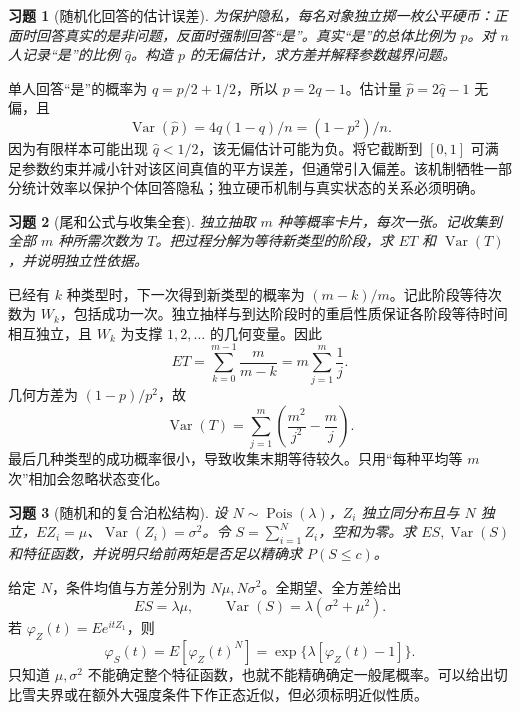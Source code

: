 \documentclass[12pt,fontset=fandol]{ctexart}
\newtheorem{exercise}{习题}[section]
\begin{document}
\begin{exercise}[随机化回答的估计误差]\label{q:B17.3}
为保护隐私，每名对象独立掷一枚公平硬币：正面时回答真实的是非问题，反面时强制回答“是”。真实“是”的总体比例为 $p$。对 $n$ 人记录“是”的比例 $\widehat q$。构造 $p$ 的无偏估计，求方差并解释参数越界问题。\par{}
\end{exercise}

\begin{solve}\label{a:B17.3}单人回答“是”的概率为 $q=p/2+1/2$，所以 $p=2q-1$。估计量 $\widehat p=2\widehat q-1$ 无偏，且\[\operatorname{Var}(\widehat p)=4q(1-q)/n=(1-p^2)/n.\]因为有限样本可能出现 $\widehat q<1/2$，该无偏估计可能为负。将它截断到 $[0,1]$ 可满足参数约束并减小针对该区间真值的平方误差，但通常引入偏差。该机制牺牲一部分统计效率以保护个体回答隐私；独立硬币机制与真实状态的关系必须明确。\end{solve}

\begin{exercise}[尾和公式与收集全套]\label{q:B17.4}
独立抽取 $m$ 种等概率卡片，每次一张。记收集到全部 $m$ 种所需次数为 $T$。把过程分解为等待新类型的阶段，求 $ET$ 和 $\operatorname{Var}(T)$，并说明独立性依据。\par{}
\end{exercise}

\begin{solve}\label{a:B17.4}已经有 $k$ 种类型时，下一次得到新类型的概率为 $(m-k)/m$。记此阶段等待次数为 $W_k$，包括成功一次。独立抽样与到达阶段时的重启性质保证各阶段等待时间相互独立，且 $W_k$ 为支撑 $1,2,\ldots$ 的几何变量。因此\[ET=\sum_{k=0}^{m-1}\frac{m}{m-k}=m\sum_{j=1}^m\frac1j.\]几何方差为 $(1-p)/p^2$，故\[\operatorname{Var}(T)=\sum_{j=1}^m\left(\frac{m^2}{j^2}-\frac mj\right).\]最后几种类型的成功概率很小，导致收集末期等待较久。只用“每种平均等 $m$ 次”相加会忽略状态变化。\end{solve}

\begin{exercise}[随机和的复合泊松结构]\label{q:B17.5}
设 $N\sim\operatorname{Pois}(\lambda)$，$Z_i$ 独立同分布且与 $N$ 独立，$EZ_i=\mu$、$\operatorname{Var}(Z_i)=\sigma^2$。令 $S=\sum_{i=1}^NZ_i$，空和为零。求 $ES,\operatorname{Var}(S)$ 和特征函数，并说明只给前两矩是否足以精确求 $P(S\le c)$。\par{}
\end{exercise}

\begin{solve}\label{a:B17.5}给定 $N$，条件均值与方差分别为 $N\mu,N\sigma^2$。全期望、全方差给出\[ES=\lambda\mu,\qquad\operatorname{Var}(S)=\lambda(\sigma^2+\mu^2).\]若 $\varphi_Z(t)=Ee^{itZ_1}$，则\[\varphi_S(t)=E[\varphi_Z(t)^N]=\exp\{\lambda[\varphi_Z(t)-1]\}.\]只知道 $\mu,\sigma^2$ 不能确定整个特征函数，也就不能精确确定一般尾概率。可以给出切比雪夫界或在额外大强度条件下作正态近似，但必须标明近似性质。\end{solve}
\end{document}
